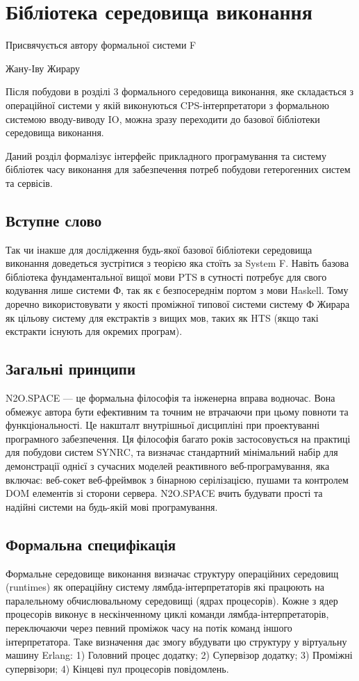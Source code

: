 \chapter{Бібліотека середовища виконання}
\epigraph{Присвячується автору формальної системи F}{Жану-Іву Жирару}

Після побудови в розділі 3 формального середовища виконання,
яке складається з операційної системи у якій виконуються
CPS-інтерпретатори з формальною системою вводу-виводу IO, можна зразу
переходити до базової бібліотеки середовища виконання.

Даний розділ формалізує інтерфейс прикладного програмування та систему
бібліотек часу виконання для забезпечення потреб побудови гетерогенних систем та сервісів.

\section*{Вступне слово}
Так чи інакше для дослідження будь-якої базової бібліотеки середовища
виконання доведеться зустрітися з теорією яка стоїть за System F.
Навіть базова бібліотека фундаментальної вищої мови PTS в сутності
потребує для свого кодування лише системи Ф, так як є безпосереднім
портом з мови Haskell. Тому доречно використовувати у якості проміжної
типової системи систему Ф Жирара як цільову систему для
екстрактів з вищих мов, таких як HTS (якщо такі екстракти існують для окремих програм).

\section{Загальні принципи}
N2O.SPACE — це формальна філософія та інженерна вправа водночас.
Вона обмежує автора бути ефективним та точним не втрачаючи
при цьому повноти та функціональності. Це накшталт внутрішньої
дисципліні при проектуванні програмного забезпечення. Ця філософія
багато років застосовується на практиці для побудови систем SYNRC,
та визначає стандартний мінімальний набір для демонстрації однієї
з сучасних моделей реактивного веб-програмування, яка включає: веб-сокет
веб-фреймвок з бінарною серілізацією, пушами та контролем DOM елементів
зі сторони сервера. N2O.SPACE вчить будувати прості та надійні системи
на будь-якій мові програмування.

\section{Формальна специфікація}
Формальне середовище виконання визначає структуру операційних середовищ (runtimes) як
операційну систему лямбда-інтерпретаторів які працюють на паралельному
обчислювальному середовищі (ядрах процесорів). Кожне з ядер процесорів
виконує в нескінченному циклі команди лямбда-інтерпретаторів, переключаючи
через певний проміжок часу на потік команд іншого інтерпретатора. Таке
визначення дає змогу вбудувати цю структуру у віртуальну машину Erlang:
1) Головний процес додатку; 2) Супервізор додатку; 3) Проміжні
супервізори; 4) Кінцеві пул процесорів повідомлень.


